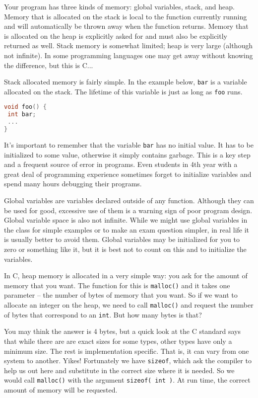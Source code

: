 Your program has three kinds of memory: global variables, stack, and heap. Memory that is allocated on the stack is local to the function currently running and will automatically be thrown away when the function returns. Memory that is allocated on the heap is explicitly asked for and must also be explicitly returned as well. Stack memory is somewhat limited; heap is very large (although not infinite). In some programming languages one may get away without knowing the difference, but this is C...

Stack allocated memory is fairly simple. In the example below, \texttt{bar} is a variable allocated on the stack. The lifetime of this variable is just as long as \texttt{foo} runs.

\begin{lstlisting}[language=C]
void foo() {
 int bar;
 ...
}
\end{lstlisting}

It's important to remember that the variable \texttt{bar} has no initial value. It has to be initialized to some value, otherwise it simply contains garbage. This is a key step and a frequent source of error in programs. Even students in 4th year with a great deal of programming experience sometimes forget to initialize variables and spend many hours debugging their programs.

Global variables are variables declared outside of any function. Although they can be used for good, excessive use of them is a warning sign of poor program design. Global variable space is also not infinite. While we might use global variables in the class for simple examples or to make an exam question simpler, in real life it is usually better to avoid them. Global variables may be initialized for you to zero or something like it, but it is best not to count on this and to initialize the variables.

In C, heap memory is allocated in a very simple way: you ask for the amount of memory that you want. The function for this is \texttt{malloc()} and it takes one parameter -- the number of bytes of memory that you want. So if we want to allocate an integer on the heap, we need to call \texttt{malloc()} and request the number of bytes that correspond to an \texttt{int}. But how many bytes is that?

You may think the answer is 4 bytes, but a quick look at the C standard says that while there are are exact sizes for some types, other types have only a minimum size. The rest is implementation specific. That is, it can vary from one system to another. Yikes! Fortunately we have \texttt{sizeof}, which ask the compiler to help us out here and substitute in the correct size where it is needed. So we would call \texttt{malloc()} with the argument \texttt{sizeof( int )}. At run time, the correct amount of memory will be requested.

